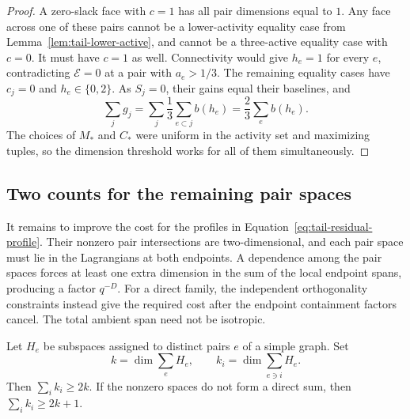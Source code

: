 \begin{proof}
A zero-slack face with \(c=1\) has all pair dimensions equal to \(1\).
Any face across one of these pairs cannot be a lower-activity equality
case from Lemma~\ref{lem:tail-lower-active}, and cannot be a
three-active equality case with \(c=0\). It must have \(c=1\) as well.
Connectivity would give \(h_e=1\) for every \(e\), contradicting
\(\mathcal E=0\) at a pair with \(a_e>1/3\). The remaining equality
cases have \(c_j=0\) and \(h_e\in\{0,2\}\). As \(S_j=0\), their gains
equal their baselines, and
\[
 \sum_jg_j=\sum_j\frac13\sum_{e\subset j}b(h_e)
          =\frac23\sum_e b(h_e).
\]
The choices of \(M_*\) and \(C_*\) were uniform in the activity set
and maximizing tuples, so the dimension threshold works for all of
them simultaneously.
\end{proof}

\subsection{Two counts for the remaining pair spaces}

It remains to improve the cost for the profiles in
Equation~\eqref{eq:tail-residual-profile}. Their nonzero pair
intersections are two-dimensional, and each pair space must lie in
the Lagrangians at both endpoints. A dependence among the pair
spaces forces at least one extra dimension in the sum of the local
endpoint spans, producing a factor \(q^{-D}\). For a direct family,
the independent orthogonality constraints instead give the required
cost after the endpoint containment factors cancel. The total
ambient span need not be isotropic.

\begin{lemma}\label{lem:tail-span}
Let $H_e$ be subspaces assigned to distinct pairs $e$ of a simple
graph.  Set
\[
 k=\dim\sum_e H_e,\qquad k_i=\dim\sum_{e\ni i}H_e.
\]
Then $\sum_i k_i\ge2k$.  If the nonzero spaces do not form a direct
sum, then $\sum_i k_i\ge2k+1$.
\end{lemma}

